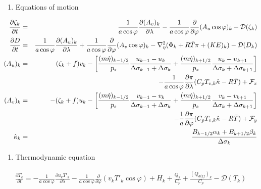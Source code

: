 \begin{enumerate}
\def\labelenumi{\arabic{enumi}.}
\setcounter{enumi}{2}
\tightlist
\item
  Equations of motion
\end{enumerate}
\begin{eqnarray}
  \frac{\partial \zeta_k}{\partial t}
        &=&   \frac{1}{a\cos\varphi}
            \frac{\partial (A_v)_k}{\partial \lambda}
          - \frac{1}{a\cos\varphi}
            \frac{\partial }{\partial \varphi} (A_u \cos\varphi)_k
          - {\mathcal D}(\zeta_k) \\
  \frac{\partial D}{\partial t}
        &=&   \frac{1}{a\cos\varphi}
            \frac{\partial (A_u)_k}{\partial \lambda}
          + \frac{1}{a\cos\varphi}
            \frac{\partial }{\partial \varphi} (A_v \cos\varphi)_k
          - \nabla^{2}_{\eta}
           ( \Phi_k + R\bar{T} \pi
             + ({\mathit KE})_k )
          - {\mathcal D}(D_k) \\
  (A_u)_k
    &=&  ( \zeta_k + f ) v_k
             - \left[ \frac{(m\dot{\eta})_{k-1/2}}{p_s} \frac{u_{k-1} - u_k}{\Delta\sigma_{k-1}+\Delta\sigma_k}
               + \frac{(m\dot{\eta})_{k+1/2}}{p_s} \frac{u_k   - u_{k+1}}{\Delta\sigma_{k}+\Delta\sigma_{k+1}} \right] \notag\\
           &&- \frac{1}{a\cos\varphi} \frac{\partial \pi}{\partial \lambda}(C_p T_{v,k}\hat{\kappa}-R\bar{T})
             + {\mathcal F}_x \\
  (A_v)_k
    &=&  - ( \zeta_k + f ) u_k
             - \left[ \frac{(m\dot{\eta})_{k-1/2}}{p_s} \frac{v_{k-1} - v_k}{\Delta\sigma_{k-1}+\Delta\sigma_k}
               + \frac{(m\dot{\eta})_{k+1/2}}{p_s} \frac{v_k   - v_{k+1}}{\Delta\sigma_{k}+\Delta\sigma_{k+1}} \right] \notag\\
           &&- \frac{1}{a} \frac{\partial \pi}{\partial \varphi}(C_p T_{v,k}\hat{\kappa}-R\bar{T})
             + {\mathcal F}_y \\
   \hat{\kappa}_k
    &=& \frac{ B_{k-1/2} \alpha_k + B_{k+1/2} \beta_k }
            { \Delta\sigma_k                                  }
\end{eqnarray}

\begin{enumerate}
\def\labelenumi{\arabic{enumi}.}
\setcounter{enumi}{3}
\tightlist
\item
  Thermodynamic equation
\end{enumerate}
\begin{eqnarray}
  \frac{\partial T_k}{\partial t}
     =  - \frac{1}{a\cos\varphi}
               \frac{\partial u_k T'_k}{\partial \lambda}
          - \frac{1}{a\cos\varphi}
               \frac{\partial }{\partial \varphi} (v_k T'_k \cos\varphi)
          + H_k
        + \frac{Q_k}{C_{p}}
          + \frac{(Q_{diff})_k}{C_p}
          - {\mathcal D}(T_k)
\end{eqnarray}

